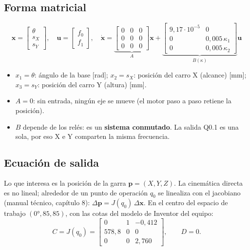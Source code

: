 \documentclass[a4paper,11pt]{article}
\begin{document}
\subsection{Forma matricial}
\[
\mathbf{x} = \begin{bmatrix}\theta\\ s_X\\ s_Y\end{bmatrix},\quad
\mathbf{u} = \begin{bmatrix}f_0\\ f_1\end{bmatrix},\quad
\dot{\mathbf{x}} = \underbrace{\begin{bmatrix}0&0&0\\0&0&0\\0&0&0\end{bmatrix}}_{A}\mathbf{x} +
\underbrace{\begin{bmatrix}9{,}17\cdot10^{-5} & 0\\ 0 & 0{,}005\,\kappa_1\\ 0 & 0{,}005\,\kappa_2\end{bmatrix}}_{B(\kappa)}\mathbf{u}
\]
\begin{itemize}
\item $x_1 = \theta$: ángulo de la base [rad]; $x_2 = s_X$: posición del carro X (alcance) [mm]; $x_3 = s_Y$: posición del carro Y (altura) [mm].
\item $A = 0$: sin entrada, ningún eje se mueve (el motor paso a paso retiene la posición).
\item $B$ depende de los relés: es un \textbf{sistema conmutado}. La salida Q0.1 es una sola, por eso X e Y comparten la misma frecuencia.
\end{itemize}

\subsection{Ecuación de salida}
Lo que interesa es la posición de la garra $\mathbf{p} = (X, Y, Z)$. La cinemática directa es no lineal; alrededor de un punto de operación $q_0$ se linealiza con el jacobiano (manual técnico, capítulo 8): $\Delta\mathbf{p} = J(q_0)\,\Delta\mathbf{x}$. En el centro del espacio de trabajo $(0°, 85, 85)$, con las cotas del modelo de Inventor del equipo:
\[
C = J(q_0) = \begin{bmatrix} 0 & 1 & -0{,}412\\ 578{,}8 & 0 & 0\\ 0 & 0 & 2{,}760\end{bmatrix}, \qquad D = 0 .
\]
\end{document}

